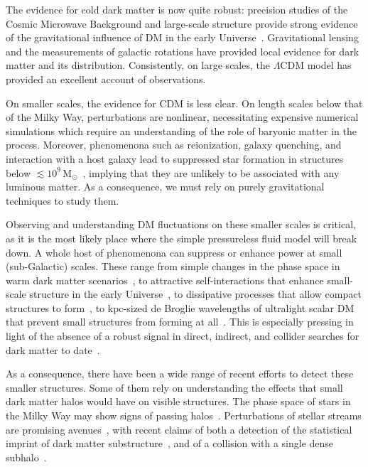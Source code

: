 \documentclass[prd,aps,twocolumn,nofootinbib,superscriptaddress,preprintnumbers,balancelastpage,longbibliography,floatfix]{revtex4-1}
\begin{document}
The evidence for cold dark matter is now quite robust: precision studies of the Cosmic Microwave Background and large-scale structure provide strong evidence of the gravitational influence of DM in the early Universe~\cite{Aghanim:2018eyx}. Gravitational lensing and the measurements of galactic rotations have provided local evidence for dark matter and its distribution. Consistently, on large scales, the $\Lambda$CDM model has provided an excellent account of observations.

On smaller scales, the evidence for CDM is less clear. On length scales below that of the Milky Way, perturbations are nonlinear, necessitating expensive numerical simulations which require an understanding of the role of baryonic matter in the process. Moreover, phenomenona such as reionization, galaxy quenching, and interaction with a host galaxy lead to suppressed star formation in structures below $\lesssim10^9 \, \mathrm{M_\odot}$~\cite{Efstathiou:1992zz,Fitts:2016usl,Read:2017lvq}, implying that they are unlikely to be associated with any luminous matter. As a consequence, we must rely on purely gravitational techniques to study them.

Observing and understanding DM fluctuations on these smaller scales is critical, as it is the most likely place where the simple pressureless fluid model will break down. A whole host of phenomenona can suppress or enhance power at small (sub-Galactic) scales. These range from simple changes in the phase space in warm dark matter scenarios~\cite{Bond:1983hb,Bode:2000gq,Dalcanton:2000hn,Boyanovsky:2008he,Boyanovsky:2010pw}, to attractive self-interactions that enhance small-scale structure in the early Universe~\cite{Arvanitaki:2019rax}, to dissipative processes that allow compact structures to form~\cite{Agrawal:2017pnb,Agrawal:2017rvu,Buckley:2017ttd,Fan:2013yva,Vogelsberger:2015gpr,Chang:2018bgx,Essig:2018pzq}, to kpc-sized de Broglie wavelengths of ultralight scalar DM that prevent small structures from forming at all~\cite{Hu:2000ke,Hui:2016ltb,Mocz:2017wlg,Du:2016zcv,Bar-Or:2018pxz,Mocz:2017wlg}. This is especially pressing in light of the absence of a robust signal in direct, indirect, and collider searches for dark matter to date~\cite{Aprile:2018dbl,Aaboud:2019yqu,Sirunyan:2016iap,Fermi-LAT:2016uux}. 

As a consequence, there have been a wide range of recent efforts to detect these smaller structures. Some of them rely on understanding the effects that small dark matter halos would have on visible structures. The phase space of stars in the Milky Way may show signs of passing halos~\cite{Buschmann:2017ams}. Perturbations of stellar streams are promising avenues~\cite{2018ApJ...867..101B,Johnston:1998bd,Carlberg:2011xj}, with recent claims of both a detection of the statistical imprint of dark matter substructure~\cite{Banik:2019cza,Banik:2019smi}, and of a collision with a single dense subhalo~\cite{Bonaca:2020psc,Bonaca:2018fek}.
\end{document}
